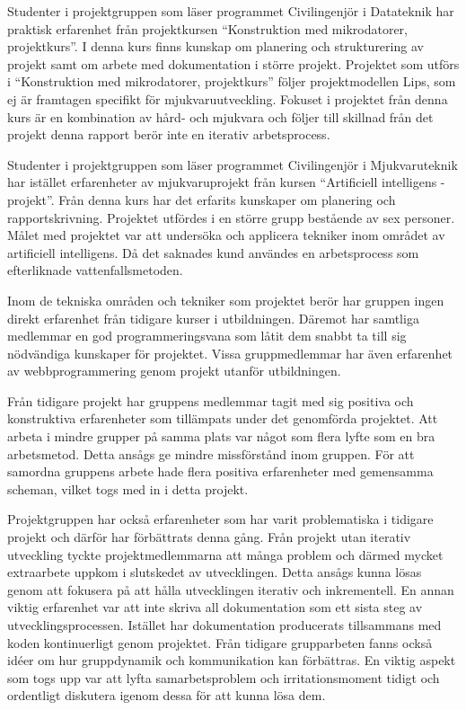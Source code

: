 Studenter i projektgruppen som läser programmet Civilingenjör i Datateknik har praktisk erfarenhet från projektkursen ``Konstruktion med mikrodatorer, projektkurs''.\cite{tsea29} I denna kurs finns kunskap om planering och strukturering av projekt samt om arbete med dokumentation i större projekt. Projektet som utförs i ``Konstruktion med mikrodatorer, projektkurs'' följer projektmodellen Lips\cite{lips}, som ej är framtagen specifikt för mjukvaruutveckling. Fokuset i projektet från denna kurs är en kombination av hård- och mjukvara och följer till skillnad från det projekt denna rapport berör inte en iterativ arbetsprocess.

Studenter i projektgruppen som läser programmet Civilingenjör i Mjukvaruteknik har istället erfarenheter av mjukvaruprojekt från kursen ``Artificiell intelligens - projekt''.\cite{tddd92} Från denna kurs har det erfarits kunskaper om planering och rapportskrivning. Projektet utfördes i en större grupp bestående av sex personer. Målet med projektet var att undersöka och applicera tekniker inom området av artificiell intelligens. Då det saknades kund användes en arbetsprocess som efterliknade vattenfallsmetoden.

Inom de tekniska områden och tekniker som projektet berör har gruppen ingen direkt erfarenhet från tidigare kurser i utbildningen. Däremot har samtliga medlemmar en god programmeringsvana som låtit dem snabbt ta till sig nödvändiga kunskaper för projektet. Vissa gruppmedlemmar har även erfarenhet av webbprogrammering genom projekt utanför utbildningen.

Från tidigare projekt har gruppens medlemmar tagit med sig positiva och konstruktiva erfarenheter som tillämpats under det genomförda projektet. Att arbeta i mindre grupper på samma plats var något som flera lyfte som en bra arbetsmetod. Detta ansågs ge mindre missförstånd inom gruppen. För att samordna gruppens arbete hade flera positiva erfarenheter med gemensamma scheman, vilket togs med in i detta projekt.

Projektgruppen har också erfarenheter som har varit problematiska i tidigare projekt och därför har förbättrats denna gång. Från projekt utan iterativ utveckling tyckte projektmedlemmarna att många problem och därmed mycket extraarbete uppkom i slutskedet av utvecklingen. Detta ansågs kunna lösas genom att fokusera på att hålla utvecklingen iterativ och inkrementell. En annan viktig erfarenhet var att inte skriva all dokumentation som ett sista steg av utvecklingsprocessen. Istället har dokumentation producerats tillsammans med koden kontinuerligt genom projektet. Från tidigare grupparbeten fanns också idéer om hur gruppdynamik och kommunikation kan förbättras. En viktig aspekt som togs upp var att lyfta samarbetsproblem och irritationsmoment tidigt och ordentligt diskutera igenom dessa för att kunna lösa dem.
